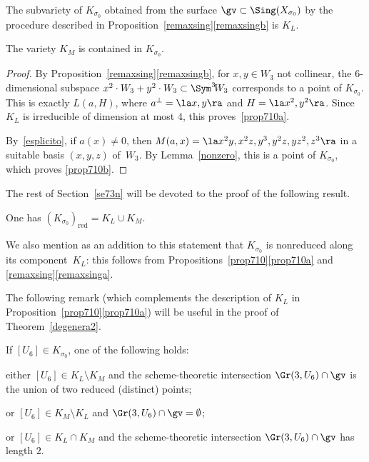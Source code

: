 \skpt
\begin{prop}\label{prop710}
\begin{enumeratea}
\item\label{prop710a}
The subvariety of $K_{\sigma_0}$ obtained from the surface $\gv \subset \Sing(X_{\sigma_0} )$ by the procedure described in Proposition~\ref{remaxsing}\eqref{remaxsingb} is $K_L$.

\item\label{prop710b}
The variety $K_M$ is contained in $K_{\sigma_0}$.
\end{enumeratea}
\end{prop}

\begin{proof}
By Proposition~\ref{remaxsing}\eqref{remaxsingb}, for $x,y\in W_3$ not collinear, the $6$-dimensional subspace $x^2\cdot W_3+y^2\cdot W_3\subset \Sym^3\! W_{3}$ corresponds to a point of $K_{\sigma_0}$. This is exactly $L(a,H)$, where $a^\perp=\la x,y\ra $ and $H=\la x^2,y^2\ra$. Since $K_L$ is irreducible of dimension at most $4$, this proves~\eqref{prop710a}.

By~\eqref{esplicito}, if $a(x)\ne 0$, then $M(a,x)=
\la x^2 y,x^2 z,y^3,y^2 z, y z^2,z^3 \ra $ in a suitable basis $(x,y,z)$ of~$W_{3}$. By Lemma~\ref{nonzero}, this is a point of $K_{\sigma_0}$, which proves \eqref{prop710b}.
\end{proof}

The rest of Section~\ref{se73n} will be devoted to the proof of the following result.

\begin{prop}\label{kappapi}
One has $(K_{\sigma_0})_\mathrm{red} =K_L\cup K_M$.
\end{prop}

We also mention as an addition to this statement that $K_{\sigma_0}$ is nonreduced along its component~$K_L$: this follows from Propositions~\ref{prop710}\eqref{prop710a} and \ref{remaxsing}\eqref{remaxsinga}.

The following remark (which complements the description of $K_L$ in Proposition~\ref{prop710}\eqref{prop710a})
will be useful in the proof of Theorem~\ref{degenera2}.

\begin{rema}\label{interver}
If $[U_6]\in K_{\sigma_0}$, one of the following holds:
\begin{enumeratea}
\item\label{intervera}
either $[U_6]\in K_L \setminus K_M$ and the scheme-theoretic intersection $\Gr(3,U_6)\cap \gv$ is the union of two reduced (distinct) points;
\item\label{interverb}
or $[U_6]\in K_M \setminus K_L $ and $\Gr(3,U_6)\cap \gv=\emptyset$;
\item\label{interverc}
or $[U_6]\in K_L \cap K_M $ and the scheme-theoretic intersection $\Gr(3,U_6)\cap \gv$ has length $2$.
\end{enumeratea}
\end{rema}

